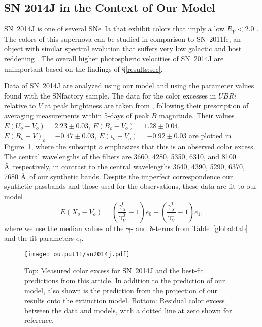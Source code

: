 \documentclass{aastex61}   	%
\begin{document}
\subsection{SN 2014J in the Context of Our Model}
\label{sn2014j:sec}
SN~2014J   is one of several SNe~Ia that exhibit colors that imply a low $R_V<2.0$ \citep{2014ApJ...788L..21A, 2014MNRAS.443.2887F, 
2014arXiv1411.3332J,
2014ApJ...795L...4K, 2015ApJ...805...74B}.
The colors of this supernova can be studied in comparison to SN~2011fe, an object with similar
spectral evolution that 
suffers very low galactic and host reddening
\citep[this technique has been used in][]{2006MNRAS.369.1880E,2007AJ....133...58K,2008MNRAS.384..107E,2010AJ....139..120F, 2014ApJ...788L..21A,
2017arXiv170101422H}.
The overall higher photospheric velocities of
SN~2014J are unimportant  based on the findings of  \S\ref{results:sec}.

Data of SN~2014J are  analyzed using our model and using the parameter values found with the SNfactory sample.
The data for the color excesses  in $UBRi$  relative to $V$ at peak brightness  are taken from \citet{2014ApJ...788L..21A},
following their prescription of averaging measurements within 5-days of peak $B$ magnitude.
Their values 
$E(U_o-V_o) =   2.23 \pm   0.03$,
$E(B_o-V_o) =   1.28 \pm   0.04$,
$E(R_o-V)_o =  -0.47 \pm   0.03$,
$E(i_o-V_o) =  -0.92 \pm   0.03$
are plotted in Figure~\ref{sn2014j:fig}, where the subscript $o$ emphasizes that this is an observed color excess.
The central wavelengths of the filters are 3660, 4280, 5350, 6310, and 8100 \AA\ respectively, in contrast to the central
wavelengths 
3640, 4390, 5290, 6370, 7680 \AA\ of our synthetic bands.  Despite the imperfect correspondence our synthetic passbands
and those used for the observations,
these data are fit to our model
\begin{equation}
E(X_o-V_o) =  \left(\frac{\gamma^0_X}{\gamma^0_V}-1\right)e_0 +  \left(\frac{\gamma^1_X}{\gamma^1_V}-1\right)e_1,
\end{equation}
where we use the median values of the $\pmb{\gamma}$- and $\pmb{\delta}$-terms from Table~\ref{global:tab} and the fit
parameters $e_i $.

\begin{figure}[htbp] %
   \centering
   \texttt{[image: output11/sn2014j.pdf]} 
   \caption{Top: Measured color excess for SN~2014J and the best-fit predictions from this article.
   \color{purple}
   In addition to the prediction
   of our model, also shown is the prediction from the projection
   of our results onto the  extinction model.  Bottom: Residual color excess
   between the data and models, with a dotted line at zero shown for reference.
   \color{black}
   \label{sn2014j:fig}}
\end{figure}
\end{document}

